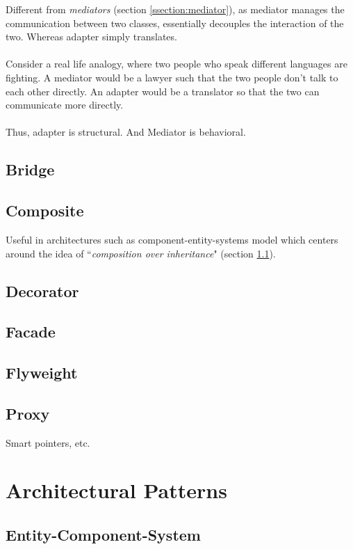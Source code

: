 \documentclass[10pt,letterpaper]{article}
\begin{document}
\begin{multicols}{2}
Different from \textit{mediators} (section \ref{ssection:mediator}), as mediator manages the communication between two classes, essentially decouples the interaction of the two. Whereas adapter simply translates.\\
\\
Consider a real life analogy, where two people who speak different languages are fighting. A mediator would be a lawyer such that the two people don't talk to each other directly. An adapter would be a translator so that the two can communicate more directly.\\
\\
Thus, adapter is structural. And Mediator is behavioral.

\subsection{Bridge}

\subsection{Composite}
Useful in architectures such as component-entity-systems model which centers around the idea of ``\textit{composition over inheritance}" (section \ref{ssection:ecs}).


\subsection{Decorator}

\subsection{Facade}

\subsection{Flyweight}

\subsection{Proxy}

Smart pointers, etc.

\section{Architectural Patterns}

\subsection{Entity-Component-System}\label{ssection:ecs}


\end{multicols}
\end{document}
